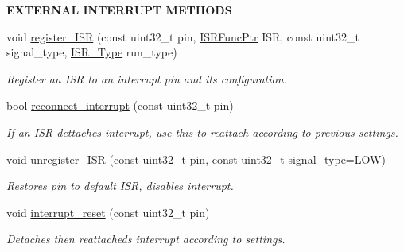 \begin{Indent}{\bf E\+X\+T\+E\+R\+N\+AL I\+N\+T\+E\+R\+R\+U\+PT M\+E\+T\+H\+O\+DS}\par
\begin{DoxyCompactItemize}
\item 
void \hyperlink{class_loom___interrupt___manager_a2d10238301b261b7cc98f5392c2d8cff}{register\+\_\+\+I\+SR} (const uint32\+\_\+t pin, \hyperlink{_interrupt___manager_8h_a21adc8a9b6cc2505b5b1317ca9f74cf3}{I\+S\+R\+Func\+Ptr} I\+SR, const uint32\+\_\+t signal\+\_\+type, \hyperlink{_interrupt___manager_8h_a1cb40265e710cbdf07f99beb6c4020d1}{I\+S\+R\+\_\+\+Type} run\+\_\+type)
\begin{DoxyCompactList}\small\item\em Register an I\+SR to an interrupt pin and its configuration. \end{DoxyCompactList}\item 
bool \hyperlink{class_loom___interrupt___manager_abbf112a7a515088c543e76f5ad2a8bea}{reconnect\+\_\+interrupt} (const uint32\+\_\+t pin)
\begin{DoxyCompactList}\small\item\em If an I\+SR dettaches interrupt, use this to reattach according to previous settings. \end{DoxyCompactList}\item 
void \hyperlink{class_loom___interrupt___manager_a314bdba78fd288871bea3421ba6ec022}{unregister\+\_\+\+I\+SR} (const uint32\+\_\+t pin, const uint32\+\_\+t signal\+\_\+type=L\+OW)
\begin{DoxyCompactList}\small\item\em Restores pin to default I\+SR, disables interrupt. \end{DoxyCompactList}\item 
void \hyperlink{class_loom___interrupt___manager_a05ba1bf76145681fecb787374358711f}{interrupt\+\_\+reset} (const uint32\+\_\+t pin)
\begin{DoxyCompactList}\small\item\em Detaches then reattacheds interrupt according to settings. \end{DoxyCompactList}\end{DoxyCompactItemize}
\end{Indent}
